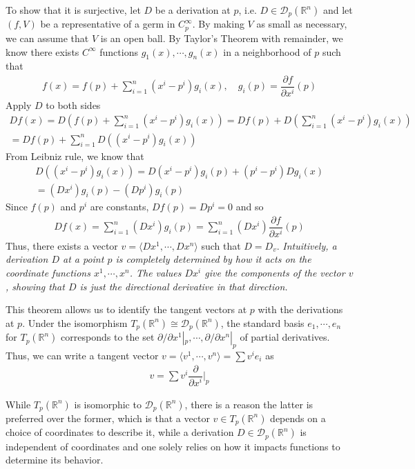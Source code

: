 \documentclass{article}
\newcommand{\R}{\mathbb{R}}
\newcommand{\Cinfty}{C^{\infty}}
\begin{document}
	To show that it is surjective, let $D$ be a derivation at $p$, i.e. $D \in \mathcal{D}_p(\R^n)$ and let $(f, V)$ be a representative of a germ in $\Cinfty_p$. By making $V$ as small as necessary, we can assume that $V$ is an open ball. By Taylor's Theorem with remainder, we know there exists $\Cinfty$ functions $g_1(x), \cdots, g_n(x)$ in a neighborhood of $p$ such that
	\begin{gather*}
		f(x) = f(p) + \sum_{i = 1}^n (x^i - p^i) g_i(x), \quad g_i(p) = \dfrac{\partial f}{\partial x^i}(p)
	\end{gather*}
	Apply $D$ to both sides
	\begin{gather*}
		D f(x) = D \left( f(p) + \sum_{i = 1}^n (x^i - p^i) g_i(x) \right) = D f(p) + D \left( \sum_{i = 1}^n (x^i - p^i) g_i(x) \right) \\
		= D f(p) + \sum_{i = 1}^n D \left( (x^i - p^i) g_i(x) \right)
	\end{gather*}
	From Leibniz rule, we know that
	\begin{gather*}
		D \left( (x^i - p^i) g_i(x) \right) = D (x^i - p^i) g_i(p) + (p^i - p^i) D g_i(x) \\
		= (D x^i) g_i(p) - (D p^i) g_i(p)
	\end{gather*}
	Since $f(p)$ and $p^i$ are constants, $D f(p) = Dp^i = 0$ and so
	\begin{gather*}
		D f(x) = \sum_{i = 1}^n (D x^i) g_i(p) = \sum_{i = 1}^n (D x^i) \dfrac{\partial f}{\partial x^i}(p)
	\end{gather*}
	Thus, there exists a vector $v = \langle D x^1, \cdots, D x^n \rangle$ such that $D = D_v$. \textit{Intuitively, a derivation $D$ at a point $p$ is completely determined by how it acts on the coordinate functions $x^1, \cdots, x^n$. The values $D x^i$ give the components of the vector $v$, showing that $D$ is just the directional derivative in that direction.}

	This theorem allows us to identify the tangent vectors at $p$ with the derivations at $p$. Under the isomorphism $T_p (\R^n) \cong \mathcal{D}_p(\R^n)$, the standard basis $e_1, \cdots, e_n$ for $T_p (\R^n)$ corresponds to the set $\partial / \partial x^1 |_p, \cdots, \partial / \partial x^n |_p $ of partial derivatives. Thus, we can write a tangent vector $v = \langle v^1, \cdots, v^n \rangle = \sum v^i e_i$ as
	\begin{gather*}
		v = \sum v^i \dfrac{\partial}{\partial x^i} \Bigg|_p
	\end{gather*}
	
	While $T_p (\R^n)$ is isomorphic to $\mathcal{D}_p(\R^n)$, there is a reason the latter is preferred over the former, which is that a vector $v \in T_p (\R^n)$ depends on a choice of coordinates to describe it, while a derivation $D \in \mathcal{D}_p(\R^n)$ is independent of coordinates and one solely relies on how it impacts functions to determine its behavior.
	
\end{document}
